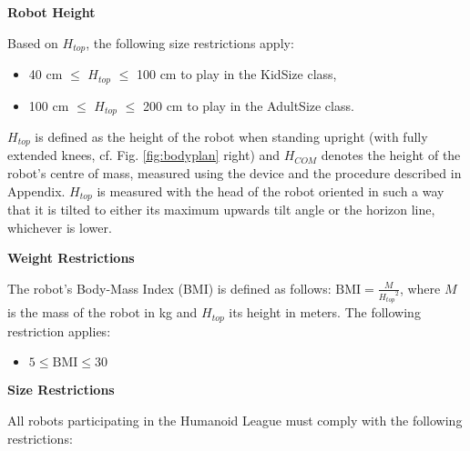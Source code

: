 \bigskip

{\bfseries Robot Height}

\headlinebox

Based on $H_{top}$, the following size restrictions apply:

\begin{itemize}
\item 40 cm ${\leq}$ $H_{top}$ ${\leq}$ 100 cm to play in the KidSize class,
\item 100 cm ${\leq}$ $H_{top}$ ${\leq}$ 200 cm to play in the AdultSize class.
\end{itemize}

$H_{top}$ is defined as the height of the robot when standing upright
(with fully extended knees, cf. Fig. \ref{fig:bodyplan} right)
and $H_{COM}$ denotes the height of the robot's centre of mass,
measured using the device and the procedure described in Appendix.
$H_{top}$ is measured with the head of the robot oriented in such a way that it
is tilted to either its maximum upwards tilt angle or the horizon line,
whichever is lower.

\bigskip

{\bfseries Weight Restrictions}

\headlinebox

The robot's Body-Mass Index (BMI) is defined as follows:
$\mathrm{BMI} = \frac{M}{{H_{top}}^2}$,
where $M$ is the mass of the robot in kg and $H_{top}$ its height in meters.
The following restriction applies:

\begin{itemize}
\item $5 \leq \mathrm{BMI} \leq 30$
\end{itemize}

\bigskip

{\bfseries Size Restrictions}

\headlinebox

All robots participating in the Humanoid League must comply with the following restrictions:


